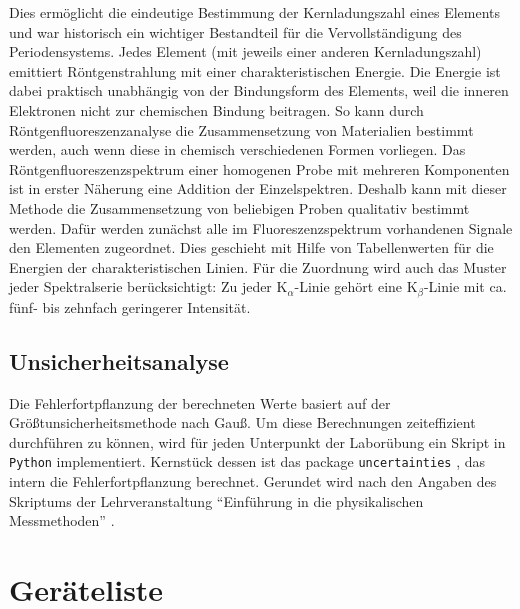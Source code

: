\documentclass[ngerman]{scrartcl}
\begin{document}
Dies ermöglicht die eindeutige
Bestimmung der Kernladungszahl eines Elements und war historisch ein wichtiger Bestandteil für die
Vervollständigung des Periodensystems. Jedes Element (mit jeweils einer anderen Kernladungszahl)
emittiert Röntgenstrahlung mit einer charakteristischen Energie. Die Energie ist dabei praktisch
unabhängig von der Bindungsform des Elements, weil die inneren Elektronen nicht zur
chemischen Bindung beitragen. So kann durch Röntgenfluoreszenzanalyse die Zusammensetzung von
Materialien bestimmt werden, auch wenn diese in chemisch verschiedenen Formen vorliegen. Das
Röntgenfluoreszenzspektrum einer homogenen Probe mit mehreren Komponenten ist in erster
Näherung eine Addition der Einzelspektren. Deshalb kann mit dieser Methode die Zusammensetzung
von beliebigen Proben qualitativ bestimmt werden. Dafür werden zunächst alle im
Fluoreszenzspektrum vorhandenen Signale den Elementen zugeordnet. Dies geschieht mit Hilfe von
Tabellenwerten für die Energien der charakteristischen Linien. Für die Zuordnung wird auch das
Muster jeder Spektralserie berücksichtigt: Zu jeder K$_\alpha$-Linie gehört eine K$_\beta$-Linie mit ca. fünf- bis zehnfach
geringerer Intensität.


\subsection{Unsicherheitsanalyse}
\label{subsec:unsicherheitsanalyse}

Die Fehlerfortpflanzung der berechneten Werte basiert auf der Größtunsicherheitsmethode nach Gauß. Um diese Berechnungen zeiteffizient durchführen zu können, wird für jeden Unterpunkt der Laborübung ein Skript in \texttt{Python} implementiert. Kernstück dessen ist das package \texttt{uncertainties} \cite{ref:uncertainties}, das intern die Fehlerfortpflanzung berechnet. Gerundet wird nach den Angaben des Skriptums der Lehrveranstaltung \enquote{Einführung in die physikalischen Messmethoden} \cite{ref:messmethoden}.



\section{Geräteliste}
\label{sec:geraeteliste}
\end{document}
